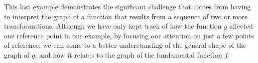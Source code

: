 \documentclass[11pt]{book}
\theoremstyle{definition}  %
\begin{document}
This last example demonstrates the significant challenge that comes from having to interpret the graph of a function that results from a sequence of two or more transformations.  Although we have only kept track of how the function $g$ affected one reference point in our example, by focusing our attention on just a few points of reference, we can come to a better understanding of the general shape of the graph of $g$, and how it relates to the graph of the fundamental function $f$.
\end{document}
